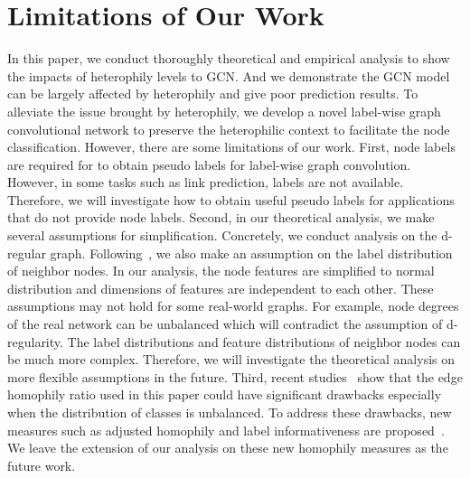 \section{Limitations of Our Work}
\label{sec:limitations}
In this paper, we conduct thoroughly theoretical and empirical analysis to show the impacts of heterophily levels to GCN.  And we demonstrate the GCN model can be largely affected by heterophily and give poor prediction results. To alleviate the issue brought by heterophily, we develop a novel label-wise graph convolutional network to preserve the heterophilic context to facilitate the node classification. However, there are some limitations of our work.  First, node labels are required for {\method} to obtain pseudo labels for label-wise graph convolution. However, in some tasks such as link prediction, labels are not available. Therefore, we will investigate how to obtain useful pseudo labels for applications that do not provide node labels. 
{
Second, in our theoretical analysis, we make several assumptions for simplification. Concretely, we conduct analysis on the d-regular graph.
Following~\cite{zhu2020beyond,luan2021heterophily}, we also make an assumption on the label distribution of neighbor nodes. In our analysis, the node features are simplified to normal distribution and dimensions of features are independent to each other. These assumptions may not hold for some real-world graphs. 
For example, node degrees of the real network can be unbalanced which will contradict the assumption of d-regularity. The label distributions and feature distributions of neighbor nodes can be much more complex. Therefore, we will investigate the theoretical analysis on more flexible assumptions in the future. Third, recent studies~\cite{luan2021heterophily,platonov2022characterizing} show that the edge homophily ratio used in this paper could have significant drawbacks especially when the distribution of classes is unbalanced. To address these drawbacks, new measures such as adjusted homophily and label informativeness are proposed~\cite{platonov2022characterizing}. We leave the extension of our analysis on these new homophily measures as the future work.
}



%
